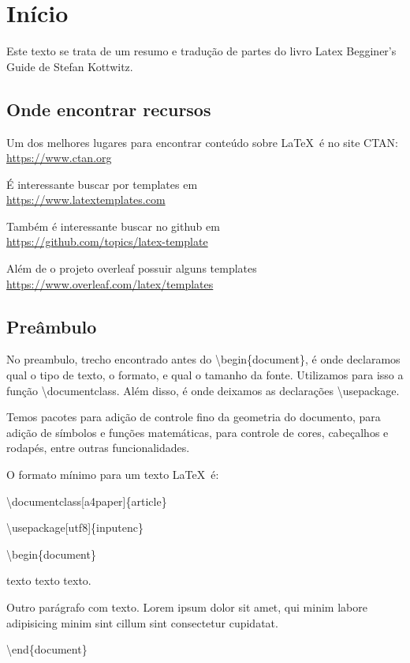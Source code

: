 \chapter{Início}
Este texto se trata de um resumo e tradução de partes do livro Latex Begginer's Guide de Stefan Kottwitz.

\section{Onde encontrar recursos}
Um dos melhores lugares para encontrar conteúdo sobre \LaTeX\ é no site CTAN:\\
\indent \url{https://www.ctan.org}

É interessante buscar por templates em\\
\indent \url{https://www.latextemplates.com}

Também é interessante buscar no github em\\
\indent \url{https://github.com/topics/latex-template}

Além de o projeto overleaf possuir alguns templates\\
\indent \url{https://www.overleaf.com/latex/templates}

\section{Preâmbulo}
No preambulo, trecho encontrado antes do \textbackslash begin\{document\},
é onde declaramos qual o tipo de texto, o formato, e qual o tamanho da fonte.
Utilizamos para isso a função \textbackslash documentclass.
Além disso, é onde deixamos as declarações \textbackslash usepackage.

Temos pacotes para adição de controle fino da geometria do documento,
para adição de símbolos e funções matemáticas,
para controle de cores, cabeçalhos e rodapés, entre outras funcionalidades.

O formato mínimo para um texto \LaTeX\ é:

\indent \textbackslash documentclass[a4paper]\{article\}

\textbackslash usepackage[utf8]\{inputenc\}

\textbackslash begin\{document\}

texto texto texto.

Outro parágrafo com texto.
Lorem ipsum dolor sit amet, qui minim labore adipisicing minim sint cillum sint consectetur cupidatat.

\textbackslash end\{document\}

